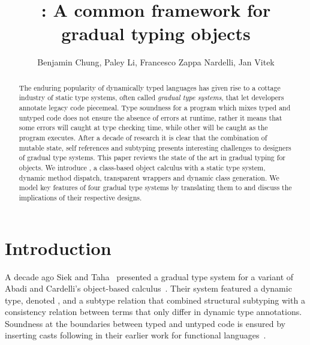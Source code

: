 \documentclass{tex/llncs}
\begin{document}
\title{\kafka: A common framework for\\ gradual typing objects}
\author{Benjamin Chung, Paley Li, Francesco Zappa Nardelli, Jan Vitek}

\maketitle



\begin{abstract}
The enduring popularity of dynamically typed languages has given rise to a
cottage industry of static type systems, often called \emph{gradual type
  systems}, that let developers annotate legacy code piecemeal. Type
soundness for a program which mixes typed and untyped code does not ensure
the absence of errors at runtime, rather it means that some errors will
caught at type checking time, while other will be caught as the program
executes. After a decade of research it is clear that the combination of
mutable state, self references and subtyping presents interesting challenges
to designers of gradual type systems.  This paper reviews the state of the
art in gradual typing for objects. We introduce \kafka, a class-based object
calculus with a static type system, dynamic method dispatch, transparent
wrappers and dynamic class generation. We model key features of four gradual
type systems by translating them to \kafka and discuss the implications of their
respective designs.
\end{abstract}

\section{Introduction}



\noindent A decade ago Siek and Taha~\cite{SiekTaha07} presented a gradual
type system for a variant of Abadi and Cardelli's object-based
calculus~\cite{cardelli:1996:theory-of-objects}. Their system featured a
dynamic type, denoted \any, and a subtype relation that combined structural
subtyping with a consistency relation between terms that only differ in
dynamic type annotations.  Soundness at the boundaries between typed and
untyped code is ensured by inserting casts following in their earlier work
for functional languages~\cite{SiekTaha06}.
\end{document}
